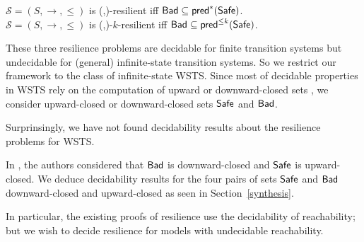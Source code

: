 \begin{remark}[Reformulation]\label{reformulation}
$\mathscr{S}=(S,\rightarrow,\leq)$ is %
(\Bad,\Safe)-resilient iff $\textsf{Bad} \subseteq \textsf{pred}^*(\textsf{Safe})$.\\
$\mathscr{S}=(S,\rightarrow,\leq)$ is %
(\Bad,\Safe)-$k$-resilient iff $\textsf{Bad} \subseteq \textsf{pred}^{\leq k}(\textsf{Safe})$.
\end{remark}

These three resilience problems are decidable for finite transition systems but undecidable for (general) infinite-state transition systems. So we restrict our framework to the class of infinite-state WSTS. Since most of decidable properties in WSTS rely on the computation of upward or downward-closed sets \cite{DBLP:journals/iandc/AbdullaCJT00, DBLP:journals/tcs/FinkelS01}, we consider upward-closed or downward-closed sets $\textsf{Safe}$ and $\textsf{Bad}$.

Surprinsingly, we have not found decidability results about the resilience problems for WSTS.

In \cite{DBLP:journals/corr/abs-2108-00889}, the authors considered that $\textsf{Bad}$ is downward-closed and $\textsf{Safe}$ is upward-closed.
%		
We deduce 
decidability results for the four pairs of sets $\textsf{Safe}$ and $\textsf{Bad}$ downward-closed and upward-closed as seen in Section~\ref{synthesis}.

In particular, the existing proofs of resilience use the decidability of reachability; but we wish to decide resilience for models with undecidable reachability.
%






\iffalse

\begin{proposition}\label{general}
\textcolor{red}{
$\mathscr{S}=(S,\rightarrow,\leq)$ is %
(\Bad,\Safe)-bounded-resilient iff $\mathscr{S}=(S,\rightarrow,\leq)$ is %
(\Bad,\Safe)-resilient (CONJECTURE FOR NOW)
}
\end{proposition}

\begin{proof}
Resilient means that ...
\end{proof}

\fi




